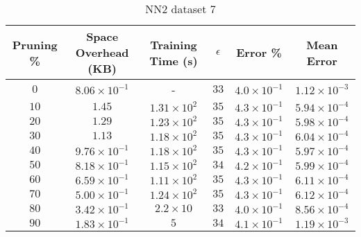 \begin{adjustwidth}{0cm}{}
\begin{table}
\caption{NN2 dataset 7}\label{pr27}
\begin{tabular}{cccccc}
\hline
\toprule
Pruning \% & Space Overhead (KB) & Training Time (s) & $\epsilon$ & Error \% & Mean Error\\
\midrule
$0$ & $8.06 \times 10^{-1}$ & - & $33$ & $4.0 \times 10^{-1}$ & $1.12 \times 10^{-3}$\\
$10$ & $1.45$ & $1.31 \times 10^{2}$ & $35$ & $4.3 \times 10^{-1}$ & $5.94 \times 10^{-4}$\\
$20$ & $1.29$ & $1.23 \times 10^{2}$ & $35$ & $4.3 \times 10^{-1}$ & $5.98 \times 10^{-4}$\\
$30$ & $1.13$ & $1.18 \times 10^{2}$ & $35$ & $4.3 \times 10^{-1}$ & $6.04 \times 10^{-4}$\\
$40$ & $9.76 \times 10^{-1}$ & $1.18 \times 10^{2}$ & $35$ & $4.3 \times 10^{-1}$ & $5.97 \times 10^{-4}$\\
$50$ & $8.18 \times 10^{-1}$ & $1.15 \times 10^{2}$ & $34$ & $4.2 \times 10^{-1}$ & $5.99 \times 10^{-4}$\\
$60$ & $6.59 \times 10^{-1}$ & $1.11 \times 10^{2}$ & $35$ & $4.3 \times 10^{-1}$ & $6.11 \times 10^{-4}$\\
$70$ & $5.00 \times 10^{-1}$ & $1.24 \times 10^{2}$ & $35$ & $4.3 \times 10^{-1}$ & $6.12 \times 10^{-4}$\\
$80$ & $3.42 \times 10^{-1}$ & $2.2 \times 10$ & $33$ & $4.0 \times 10^{-1}$ & $8.56 \times 10^{-4}$\\
$90$ & $1.83 \times 10^{-1}$ & $5$ & $34$ & $4.1 \times 10^{-1}$ & $1.19 \times 10^{-3}$\\
\bottomrule
\end{tabular}
\end{table}
\end{adjustwidth}

